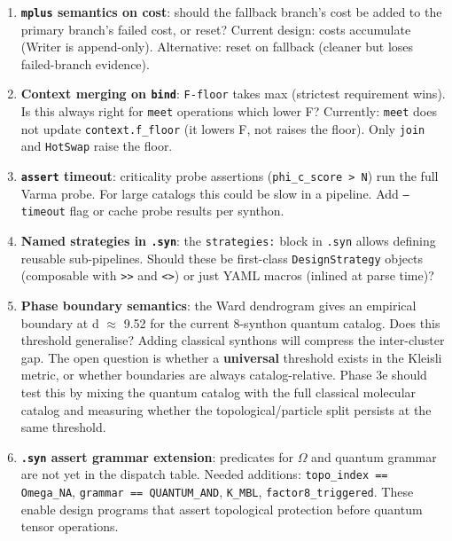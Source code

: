 \documentclass[12pt,a4paper]{article}
\begin{document}
\begin{enumerate}
    \item \textbf{\texttt{mplus} semantics on cost}: should the fallback branch's cost be added to the primary branch's failed cost, or reset? Current design: costs accumulate (Writer is append-only). Alternative: reset on fallback (cleaner but loses failed-branch evidence).
    \item \textbf{Context merging on \texttt{bind}}: \texttt{F-floor} takes max (strictest requirement wins). Is this always right for \texttt{meet} operations which lower F? Currently: \texttt{meet} does not update \texttt{context.f\_floor} (it lowers F, not raises the floor). Only \texttt{join} and \texttt{HotSwap} raise the floor.
    \item \textbf{\texttt{assert} timeout}: criticality probe assertions (\texttt{phi\_c\_score \textgreater{} N}) run the full Varma probe. For large catalogs this could be slow in a pipeline. Add \texttt{--timeout} flag or cache probe results per synthon.
    \item \textbf{Named strategies in \texttt{.syn}}: the \texttt{strategies:} block in \texttt{.syn} allows defining reusable sub-pipelines. Should these be first-class \texttt{DesignStrategy} objects (composable with \texttt{\textgreater{}\textgreater{}} and \texttt{\textless{}\textbar{}\textgreater{}}) or just YAML macros (inlined at parse time)?
    \item \textbf{Phase boundary semantics}: the Ward dendrogram gives an empirical boundary at d $\approx$ 9.52 for the current 8-synthon quantum catalog. Does this threshold generalise? Adding classical synthons will compress the inter-cluster gap. The open question is whether a \textbf{universal} threshold exists in the Kleisli metric, or whether boundaries are always catalog-relative. Phase 3e should test this by mixing the quantum catalog with the full classical molecular catalog and measuring whether the topological/particle split persists at the same threshold.
    \item \textbf{\texttt{.syn} assert grammar extension}: predicates for $\Omega$ and quantum grammar are not yet in the dispatch table. Needed additions: \texttt{topo\_index == Omega\_NA}, \texttt{grammar == QUANTUM\_AND}, \texttt{K\_MBL}, \texttt{factor8\_triggered}. These enable design programs that assert topological protection before quantum tensor operations.
\end{enumerate}
\end{document}
